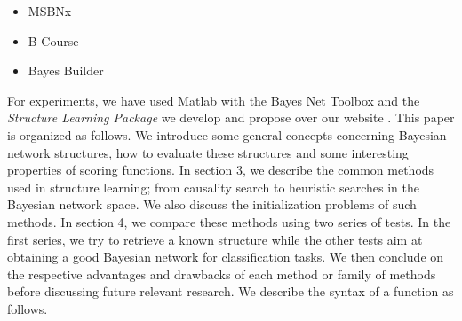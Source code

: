 \begin{multicols}{2}
\begin{itemize}
\item MSBNx  \cite{MSBN}%
\item B-Course  \cite{BCOURSE}%
\item Bayes Builder  \cite{BAYESBUILDER}%
\end{itemize}
\end{multicols}
\normalsize
\vspace*{-.4\baselineskip}

For experiments, we have used Matlab with the Bayes Net Toolbox \cite{BNT04} and the \textit{Structure Learning Package} we develop and propose over our website \cite{INSA}.
This paper is organized as follows. 
We introduce some general concepts concerning Bayesian network structures, how to evaluate these structures and some interesting properties of scoring functions.
In section 3, we describe the common methods used in structure learning; from causality search to heuristic searches in the Bayesian network space. We also discuss the initialization problems of such methods.
In section 4, we compare these methods using two series of tests. In the first series, we try to retrieve a known structure while the other tests aim at obtaining a good Bayesian network for classification tasks.
We then conclude on the respective advantages and drawbacks of each method or family of methods before discussing future relevant research.
We describe the syntax of a function as follows.
\vspace*{-\baselineskip}

